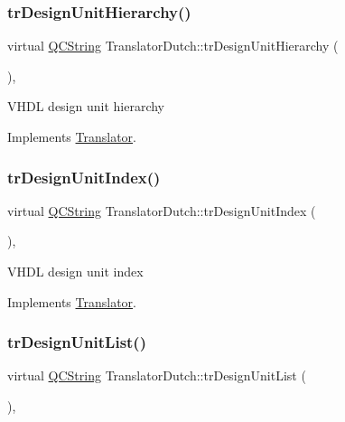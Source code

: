\subsubsection{\texorpdfstring{trDesignUnitHierarchy()}{trDesignUnitHierarchy()}}
{\footnotesize\ttfamily virtual \mbox{\hyperlink{class_q_c_string}{Q\+C\+String}} Translator\+Dutch\+::tr\+Design\+Unit\+Hierarchy (\begin{DoxyParamCaption}{ }\end{DoxyParamCaption})\hspace{0.3cm}{\ttfamily [inline]}, {\ttfamily [virtual]}}

V\+H\+DL design unit hierarchy 

Implements \mbox{\hyperlink{class_translator}{Translator}}.

\mbox{\label{class_translator_dutch_a2d5914541058849ab274b8485a239373}} 
\subsubsection{\texorpdfstring{trDesignUnitIndex()}{trDesignUnitIndex()}}
{\footnotesize\ttfamily virtual \mbox{\hyperlink{class_q_c_string}{Q\+C\+String}} Translator\+Dutch\+::tr\+Design\+Unit\+Index (\begin{DoxyParamCaption}{ }\end{DoxyParamCaption})\hspace{0.3cm}{\ttfamily [inline]}, {\ttfamily [virtual]}}

V\+H\+DL design unit index 

Implements \mbox{\hyperlink{class_translator}{Translator}}.

\mbox{\label{class_translator_dutch_ac73c40db894398589c12f266dfda5860}} 
\subsubsection{\texorpdfstring{trDesignUnitList()}{trDesignUnitList()}}
{\footnotesize\ttfamily virtual \mbox{\hyperlink{class_q_c_string}{Q\+C\+String}} Translator\+Dutch\+::tr\+Design\+Unit\+List (\begin{DoxyParamCaption}{ }\end{DoxyParamCaption})\hspace{0.3cm}{\ttfamily [inline]}, {\ttfamily [virtual]}}

